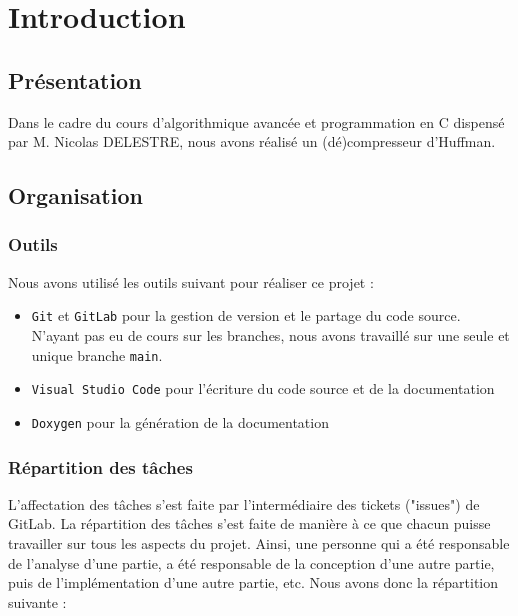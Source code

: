\chapter{Introduction}

\section{Présentation}

Dans le cadre du cours d'algorithmique avancée et programmation en C dispensé par M. Nicolas DELESTRE,
nous avons réalisé un (dé)compresseur d'Huffman.

\section{Organisation}

\subsection{Outils}

Nous avons utilisé les outils suivant pour réaliser ce projet :

\begin{itemize}
    \item \texttt{Git} et \texttt{GitLab} pour la gestion de version et le partage du code source. N'ayant pas eu de cours sur les branches, nous avons travaillé sur une seule et unique branche \texttt{main}.
    \item \texttt{Visual Studio Code} pour l'écriture du code source et de la documentation
    \item \texttt{Doxygen} pour la génération de la documentation
\end{itemize}

\subsection{Répartition des tâches}

L'affectation des tâches s'est faite par l'intermédiaire des tickets ("issues") de GitLab. 
La répartition des tâches s'est faite de manière à ce que chacun puisse travailler sur tous les aspects du projet. 
Ainsi, une personne qui a été responsable de l'analyse d'une partie, a été responsable de la conception d'une autre partie, puis de l'implémentation d'une autre partie, etc.
Nous avons donc la répartition suivante :

